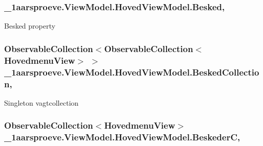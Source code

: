 \subsubsection[{Besked}]{ \+\_\+1aarsproeve.\+View\+Model.\+Hoved\+View\+Model.\+Besked\hspace{0.3cm}{\ttfamily [get]}, {\ttfamily [set]}}\label{class__1aarsproeve_1_1_view_model_1_1_hoved_view_model_ad0bb692f6eaf30a6d71f76da7d23a512}


Besked property 

\hypertarget{class__1aarsproeve_1_1_view_model_1_1_hoved_view_model_ac123bfcd71b56f5aba5a60f18d42f5b6}{}
\subsubsection[{Besked\+Collection}]{\setlength{\rightskip}{0pt plus 5cm}Observable\+Collection$<$Observable\+Collection$<${\bf Hovedmenu\+View}$>$ $>$ \+\_\+1aarsproeve.\+View\+Model.\+Hoved\+View\+Model.\+Besked\+Collection\hspace{0.3cm}{\ttfamily [get]}, {\ttfamily [set]}}\label{class__1aarsproeve_1_1_view_model_1_1_hoved_view_model_ac123bfcd71b56f5aba5a60f18d42f5b6}


Singleton vagtcollection 

\hypertarget{class__1aarsproeve_1_1_view_model_1_1_hoved_view_model_a75cca0494e9b39bb827eb182f927cea5}{}
\subsubsection[{Beskeder\+C}]{\setlength{\rightskip}{0pt plus 5cm}Observable\+Collection$<${\bf Hovedmenu\+View}$>$ \+\_\+1aarsproeve.\+View\+Model.\+Hoved\+View\+Model.\+Beskeder\+C\hspace{0.3cm}{\ttfamily [get]}, {\ttfamily [set]}}\label{class__1aarsproeve_1_1_view_model_1_1_hoved_view_model_a75cca0494e9b39bb827eb182f927cea5}


